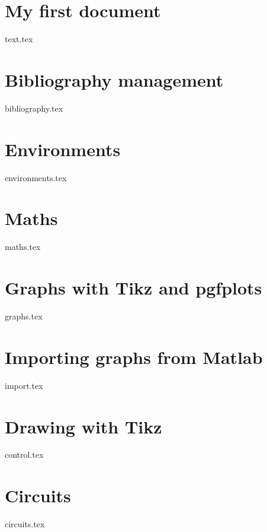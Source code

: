 \section{My first document}
    {text.tex}
\section{Bibliography management}
    {bibliography.tex}
\section{Environments}
    {environments.tex}
\section{Maths}
    {maths.tex}
\section{Graphs with Tikz and pgfplots}
    {graphs.tex}
\section{Importing graphs from Matlab}
    {import.tex}
\section{Drawing with Tikz}
    {control.tex}
\section{Circuits}
    {circuits.tex}